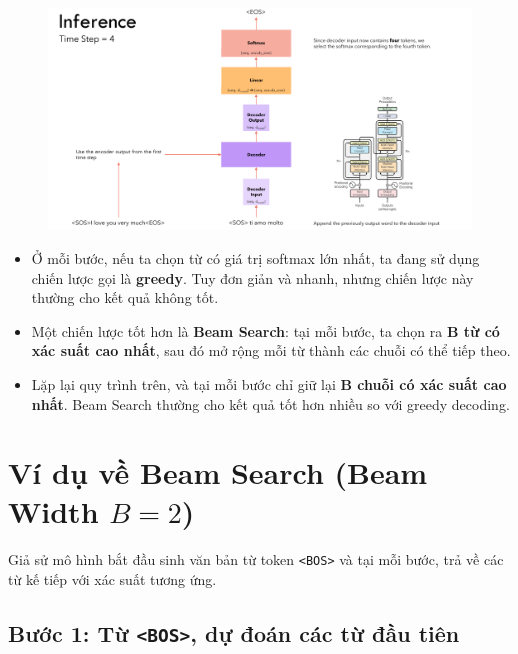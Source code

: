 \documentclass{book}
\begin{document}
        \begin{figure}[H]
            \centering
            \includegraphics[width=1.0  \linewidth]{images/12d_22.png}
    
        \end{figure}
        \begin{itemize}
          \item Ở mỗi bước, nếu ta chọn từ có giá trị softmax lớn nhất, ta đang sử dụng chiến lược gọi là \textbf{greedy}.  
          Tuy đơn giản và nhanh, nhưng chiến lược này thường cho kết quả không tốt.
        
          \item Một chiến lược tốt hơn là \textbf{Beam Search}: tại mỗi bước, ta chọn ra \textbf{B từ có xác suất cao nhất}, sau đó mở rộng mỗi từ thành các chuỗi có thể tiếp theo.
        
          \item Lặp lại quy trình trên, và tại mỗi bước chỉ giữ lại \textbf{B chuỗi có xác suất cao nhất}.  
          Beam Search thường cho kết quả tốt hơn nhiều so với greedy decoding.
        \end{itemize}
        \section*{Ví dụ về Beam Search (Beam Width $B=2$)}

        Giả sử mô hình bắt đầu sinh văn bản từ token \texttt{<BOS>} và tại mỗi bước, trả về các từ kế tiếp với xác suất tương ứng.
        
        \subsection*{Bước 1: Từ \texttt{<BOS>}, dự đoán các từ đầu tiên}
        
\end{document}
